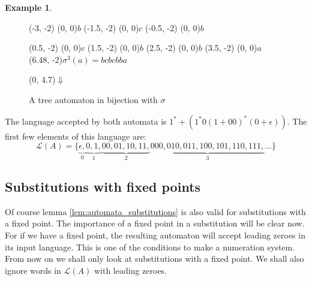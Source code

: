\documentclass{article}
\theoremstyle{definition}
\newtheorem{example}[theorem]{Example}
\begin{document}
\begin{example}
\begin{figure}[p]
\begin{graph}
  (-3, -2)  (0, 0){$b$} %
  (-1.5, -2)  (0, 0){$c$}
  (-0.5, -2) (0, 0){$b$}

  (0.5, -2)  (0, 0){$c$}
  (1.5, -2)  (0, 0){$b$}
  (2.5, -2)  (0, 0){$b$}
  (3.5, -2)  (0, 0){$a$}
  \freetext(6.48, -2){$\sigma^3(a) = bcbcbba$}

   
   

   
   
   
   

   
   
   
   
   
   
   

  \freetext(0, 4.7){$\Downarrow$}
\end{graph}
\caption{A tree automaton in bijection with $\sigma$}
\label{fig:automata_tree_substitutions}
\end{figure}
The language accepted by both automata is 
$1^* + (1^* 0 (1 + 00)^* (0 + \epsilon))$. The first few elements of this
language are:
\begin{displaymath}
\mathcal{L}(A) = \{\underbrace{\epsilon,}_0
\underbrace{0, 1,}_1
\underbrace{00, 01, 10, 11,}_ 2
\underbrace{000, 010, 011, 100, 101, 110, 111,}_3 \ldots\}
\end{displaymath}
\end{example}

\subsection{Substitutions with fixed points} 
Of course lemma \ref{lem:automata_substitutions} is also valid for 
substitutions with a fixed point. The importance of a fixed point in a 
substitution will be clear now. For if we have a fixed point, the resulting 
automaton will accept leading zeroes in its input language. This is one of the 
conditions to make a numeration system. From now on we shall only look at 
substitutions with a fixed point. We shall also ignore words in 
$\mathcal{L}(A)$ with leading zeroes.
\end{document}
